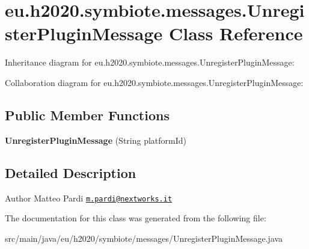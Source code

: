 \hypertarget{classeu_1_1h2020_1_1symbiote_1_1messages_1_1UnregisterPluginMessage}{}\section{eu.\+h2020.\+symbiote.\+messages.\+Unregister\+Plugin\+Message Class Reference}
\label{classeu_1_1h2020_1_1symbiote_1_1messages_1_1UnregisterPluginMessage}


Inheritance diagram for eu.\+h2020.\+symbiote.\+messages.\+Unregister\+Plugin\+Message\+:


Collaboration diagram for eu.\+h2020.\+symbiote.\+messages.\+Unregister\+Plugin\+Message\+:
\subsection*{Public Member Functions}
\begin{DoxyCompactItemize}
\item 
\mbox{\label{classeu_1_1h2020_1_1symbiote_1_1messages_1_1UnregisterPluginMessage_afa3e58b57c90433a2cf31f2b17be55bd}} 
{\bfseries Unregister\+Plugin\+Message} (String platform\+Id)
\end{DoxyCompactItemize}


\subsection{Detailed Description}
\begin{DoxyAuthor}{Author}
Matteo Pardi \href{mailto:m.pardi@nextworks.it}{\tt m.\+pardi@nextworks.\+it} 
\end{DoxyAuthor}


The documentation for this class was generated from the following file\+:\begin{DoxyCompactItemize}
\item 
src/main/java/eu/h2020/symbiote/messages/Unregister\+Plugin\+Message.\+java\end{DoxyCompactItemize}
